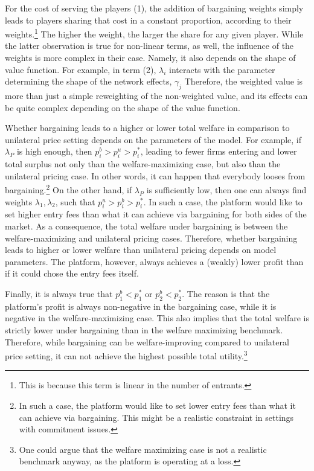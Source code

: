 \documentclass[a4paper]{article}
\begin{document}
For the cost of serving the players (1), the addition of bargaining weights simply leads to players sharing that cost in a constant proportion, according to their weights.\footnote{
    This is because this term is linear in the number of entrants.
}
The higher the weight, the larger the share for any given player.
While the latter observation is true for non-linear terms, as well, the influence of the weights is more complex in their case.
Namely, it also depends on the shape of value function.
For example, in term (2), $\lambda_i$ interacts with the parameter determining the shape of the network effects, $\gamma_j$
Therefore, the weighted value is more than just a simple reweighting of the non-weighted value, and its effects can be quite complex depending on the shape of the value function.

Whether bargaining leads to a higher or lower total welfare in comparison to unilateral price setting depends on the parameters of the model.
For example, if $\lambda_P$ is high enough, then $p_i^b > p_i^u > p_i^*$, leading to fewer firms entering and lower total surplus not only than the welfare-maximizing case, but also than the unilateral pricing case.
In other words, it can happen that everybody looses from bargaining.\footnote{
    In such a case, the platform would like to set lower entry fees than what it can achieve via bargaining.
    This might be a realistic constraint in settings with commitment issues.
}
On the other hand, if $\lambda_P$ is sufficiently low, then one can always find weights $\lambda_1, \lambda_2$, such that $p_i^u > p_i^b > p_i^*$.
In such a case, the platform would like to set higher entry fees than what it can achieve via bargaining for both sides of the market.
As a consequence, the total welfare under bargaining is between the welfare-maximizing and unilateral pricing cases.
Therefore, whether bargaining leads to higher or lower welfare than unilateral pricing depends on model parameters.
The platform, however, always achieves a (weakly) lower profit than if it could chose the entry fees itself.

Finally, it is always true that $p_1^b < p_1^*$ or $p_2^b < p_2^*$.
The reason is that the platform's profit is always non-negative in the bargaining case, while it is negative in the welfare-maximizing case.
This also implies that the total welfare is strictly lower under bargaining than in the welfare maximizing benchmark.
Therefore, while bargaining can be welfare-improving compared to unilateral price setting, it can not achieve the highest possible total utility.\footnote{
    One could argue that the welfare maximizing case is not a realistic benchmark anyway, as the platform is operating at a loss.
}
\end{document}
